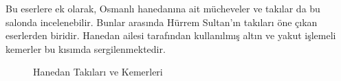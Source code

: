 \indent Bu eserlere ek olarak, Osmanlı hanedanına ait mücheveler ve takılar da bu salonda incelenebilir. Bunlar arasında Hürrem Sultan'ın takıları öne çıkan eserlerden biridir. Hanedan ailesi tarafından kullanılmış altın ve yakut işlemeli kemerler bu kısımda sergilenmektedir.
\begin{figure}[H]
    \centering
    \hfill
    \caption{Hanedan Takıları ve Kemerleri}
\end{figure}